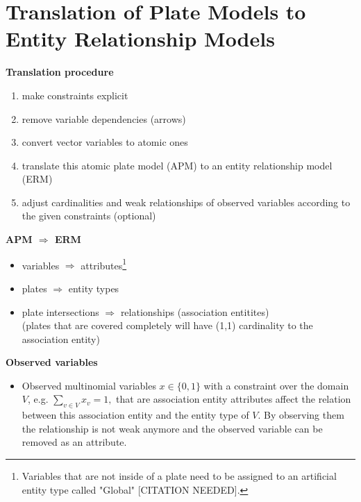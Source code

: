 \section{Translation of Plate Models to Entity Relationship Models}

\textbf{Translation procedure}
\begin{enumerate}
\item make constraints explicit
\item remove variable dependencies (arrows)
\item convert vector variables to atomic ones
\item translate this atomic plate model (APM) to an entity relationship model (ERM)
\item adjust cardinalities and weak relationships of observed variables according to the given constraints (optional)
\end{enumerate}

\textbf{APM $\Rightarrow$ ERM}
\begin{itemize}
\item variables $\Rightarrow$ attributes\footnote{Variables that are not inside of a plate need to be assigned to an artificial entity type called "Global" [CITATION NEEDED].}
\item plates $\Rightarrow$ entity types
\item plate intersections $\Rightarrow$ relationships (association entitites)\\
	(plates that are covered completely will have (1,1) cardinality to the association entity)
\end{itemize}

\textbf{Observed variables}
\begin{itemize}
\item Observed multinomial variables $x \in \{0,1\}$ with a constraint over the domain $V$, e.g. $\sum_{v \in V} x_v = 1,$ that are association entity attributes affect the relation between this association entity and the entity type of $V$. By observing them the relationship is not weak anymore and the observed variable can be removed as an attribute.
\end{itemize}